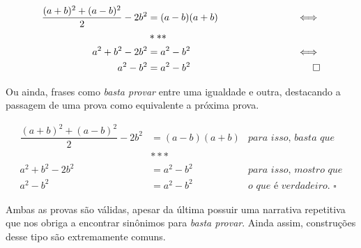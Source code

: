   \begin{equation*}
    \begin{aligned}
      \dfrac{(a+b)^2+(a-b)^2}{2}-2b^2 &= (a-b)(a+b) &\hspace{25mm}\iff \\
      &***&\\
      a^2+b^2-2b^2 &= a^2-b^2 &\hspace{25mm}\iff \\
      a^2-b^2 &= a^2-b^2 & \hspace{25mm}\square
    \end{aligned}
  \end{equation*}

Ou ainda, frases como \textit{basta provar} entre uma igualdade e outra, destacando a passagem de uma prova como equivalente a próxima prova.

  \begin{equation*}
    \begin{aligned}
      \dfrac{(a+b)^2+(a-b)^2}{2}-2b^2 &= (a-b)(a+b) & \textit{para isso, basta que} \\
      &***&\\
      a^2+b^2-2b^2 &= a^2-b^2 & \textit{para isso, mostro que} \\
      a^2-b^2 &= a^2-b^2 & \textit{o que é verdadeiro. } \square
    \end{aligned}
  \end{equation*}

\noindent Ambas as provas são válidas, apesar da última possuir uma narrativa repetitiva que nos obriga a encontrar sinônimos para \textit{basta provar}. Ainda assim, construções desse tipo são extremamente comuns.


